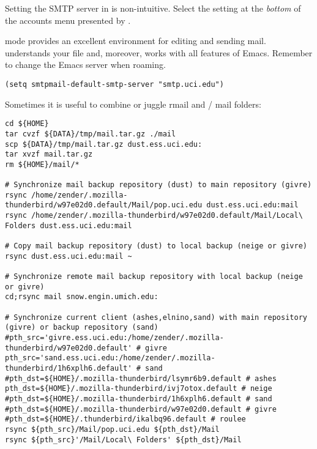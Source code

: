 \documentclass[12pt,twoside]{article}
\begin{document}
Setting the SMTP server in  is non-intuitive.
Select the  setting at the
\textit{bottom} of the accounts menu presented by 
.

  mode provides an excellent environment
for editing and sending mail. 
 understands your  file and, moreover, 
works with all features of Emacs.
Remember to change the Emacs  server when roaming.
\begin{verbatim}
(setq smtpmail-default-smtp-server "smtp.uci.edu") 
\end{verbatim}

Sometimes it is useful to combine or juggle rmail and
/ mail folders:
\begin{verbatim}
cd ${HOME}
tar cvzf ${DATA}/tmp/mail.tar.gz ./mail
scp ${DATA}/tmp/mail.tar.gz dust.ess.uci.edu:
tar xvzf mail.tar.gz
rm ${HOME}/mail/*

# Synchronize mail backup repository (dust) to main repository (givre) 
rsync /home/zender/.mozilla-thunderbird/w97e02d0.default/Mail/pop.uci.edu dust.ess.uci.edu:mail
rsync /home/zender/.mozilla-thunderbird/w97e02d0.default/Mail/Local\ Folders dust.ess.uci.edu:mail

# Copy mail backup repository (dust) to local backup (neige or givre) 
rsync dust.ess.uci.edu:mail ~

# Synchronize remote mail backup repository with local backup (neige or givre) 
cd;rsync mail snow.engin.umich.edu:

# Synchronize current client (ashes,elnino,sand) with main repository (givre) or backup repository (sand)
#pth_src='givre.ess.uci.edu:/home/zender/.mozilla-thunderbird/w97e02d0.default' # givre
pth_src='sand.ess.uci.edu:/home/zender/.mozilla-thunderbird/1h6xplh6.default' # sand
#pth_dst=${HOME}/.mozilla-thunderbird/lsymr6b9.default # ashes
pth_dst=${HOME}/.mozilla-thunderbird/ivj7otox.default # neige
#pth_dst=${HOME}/.mozilla-thunderbird/1h6xplh6.default # sand
#pth_dst=${HOME}/.mozilla-thunderbird/w97e02d0.default # givre
#pth_dst=${HOME}/.thunderbird/ikalbq96.default # roulee
rsync ${pth_src}/Mail/pop.uci.edu ${pth_dst}/Mail
rsync ${pth_src}'/Mail/Local\ Folders' ${pth_dst}/Mail
\end{verbatim}
\end{document}
